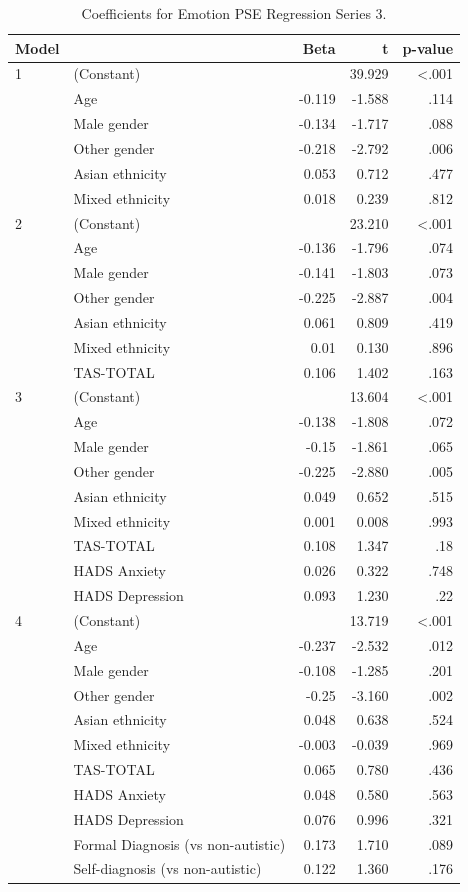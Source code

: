 \documentclass[
]{article}
\begin{document}
\begin{table}[H]

\caption{\label{tab:table8}Coefficients for Emotion PSE Regression Series 3.}
\centering
\begin{tabular}[t]{llrrr}
\toprule
Model &  & Beta & t & p-value\\
\midrule
1 & (Constant) &  & 39.929 & <.001\\
 & Age & -0.119 & -1.588 & .114\\
 & Male gender & -0.134 & -1.717 & .088\\
 & Other gender & -0.218 & -2.792 & .006\\
 & Asian ethnicity & 0.053 & 0.712 & .477\\
\addlinespace
 & Mixed ethnicity & 0.018 & 0.239 & .812\\
2 & (Constant) &  & 23.210 & <.001\\
 & Age & -0.136 & -1.796 & .074\\
 & Male gender & -0.141 & -1.803 & .073\\
 & Other gender & -0.225 & -2.887 & .004\\
\addlinespace
 & Asian ethnicity & 0.061 & 0.809 & .419\\
 & Mixed ethnicity & 0.01 & 0.130 & .896\\
 & TAS-TOTAL & 0.106 & 1.402 & .163\\
3 & (Constant) &  & 13.604 & <.001\\
 & Age & -0.138 & -1.808 & .072\\
\addlinespace
 & Male gender & -0.15 & -1.861 & .065\\
 & Other gender & -0.225 & -2.880 & .005\\
 & Asian ethnicity & 0.049 & 0.652 & .515\\
 & Mixed ethnicity & 0.001 & 0.008 & .993\\
 & TAS-TOTAL & 0.108 & 1.347 & .18\\
\addlinespace
 & HADS Anxiety & 0.026 & 0.322 & .748\\
 & HADS Depression & 0.093 & 1.230 & .22\\
4 & (Constant) &  & 13.719 & <.001\\
 & Age & -0.237 & -2.532 & .012\\
 & Male gender & -0.108 & -1.285 & .201\\
\addlinespace
 & Other gender & -0.25 & -3.160 & .002\\
 & Asian ethnicity & 0.048 & 0.638 & .524\\
 & Mixed ethnicity & -0.003 & -0.039 & .969\\
 & TAS-TOTAL & 0.065 & 0.780 & .436\\
 & HADS Anxiety & 0.048 & 0.580 & .563\\
\addlinespace
 & HADS Depression & 0.076 & 0.996 & .321\\
 & Formal Diagnosis (vs non-autistic) & 0.173 & 1.710 & .089\\
 & Self-diagnosis (vs non-autistic) & 0.122 & 1.360 & .176\\
\bottomrule
\end{tabular}
\end{table}
\end{document}
